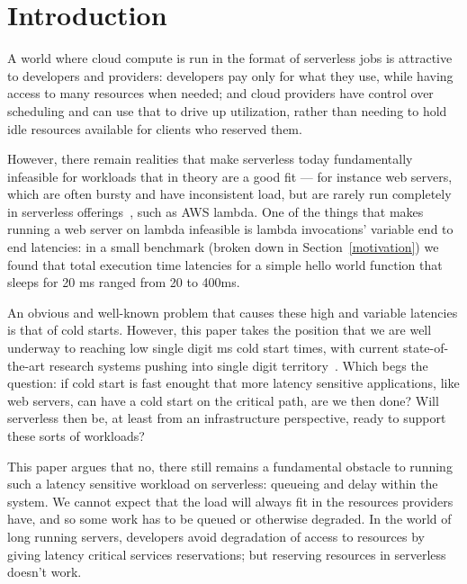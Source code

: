 \section{Introduction}

A world where cloud compute is run in the format of serverless jobs is
attractive to developers and providers: developers pay only for what they use,
while having access to many resources when needed; and cloud providers have
control over scheduling and can use that to drive up utilization, rather than
needing to hold idle resources available for clients who reserved them.


However, there remain realities that make serverless today fundamentally
infeasible for workloads that in theory are a good fit --- for instance web
servers, which are often bursty and have inconsistent load, but are rarely run
completely in serverless offerings~\cite{reddit-serverless1}, such as AWS lambda.
One of the things that makes running a web server on lambda infeasible is lambda
invocations' variable end to end latencies: in a small benchmark (broken down in
Section~\ref{motivation}) we found that total execution time latencies for a
simple hello world function that sleeps for 20 ms ranged from 20 to 400ms.

An obvious and well-known problem that causes these high and variable latencies
is that of cold starts. However, this paper takes the position that we are well
underway to reaching low single digit ms cold start times, with current
state-of-the-art research systems pushing into single digit
territory~\cite{sigmaos,mitosis}. Which begs the question: if cold start is fast enought
that more latency sensitive applications, like web servers, can have a cold
start on the critical path, are we then done? Will serverless then be, at least
from an infrastructure perspective, ready to support these sorts of workloads?

This paper argues that no, there still remains a fundamental obstacle to running
such a latency sensitive workload on serverless: queueing and delay within the
system. We cannot expect that the load will always fit in the resources
providers have, and so some work has to be queued or otherwise degraded. In the
world of long running servers, developers avoid degradation of access to
resources by giving latency critical services reservations; but reserving
resources in serverless doesn't work. 

